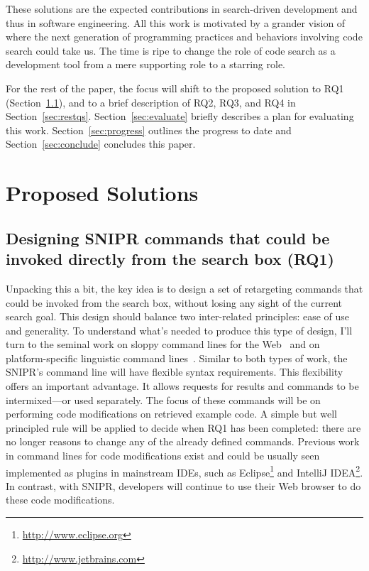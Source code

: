 \documentclass[conference]{IEEEtran}
\begin{document}
These solutions are the expected contributions in search-driven development and thus in software engineering. All this work is motivated by a grander vision of where the next generation of programming practices and behaviors involving code search could take us. The time is ripe to change the role of code search as a development tool from a mere supporting role to a starring role. 

For the rest of the paper, the focus will shift to the proposed solution to RQ1 (Section~\ref{sec:rq1}), and to a brief description of RQ2, RQ3, and RQ4 in Section~\ref{sec:restqs}. Section~\ref{sec:evaluate} briefly describes a plan for evaluating this work. Section~\ref{sec:progress} outlines the progress to date and Section~\ref{sec:conclude} concludes this paper. 

\section{Proposed Solutions}
\subsection{Designing \uppercase{SnipR} commands that could be invoked directly from the search box (RQ1)}
\label{sec:rq1}
Unpacking this a bit, the key idea is to design a set of retargeting commands that could be invoked from the search box, without losing any sight of the current search goal. This design should balance two inter-related principles: ease of use and generality. To understand what's needed to produce this type of design, I'll turn to the seminal work on sloppy command lines for the Web~\cite{Little:2007dh, Miller:2008ge} and on platform-specific linguistic command lines~\cite{Raskin:2008wb}. Similar to both types of work, the \uppercase{SnipR}'s command line will have flexible syntax requirements. This flexibility offers an important advantage. It allows requests for results and commands to be intermixed---or used separately. The focus of these commands will be on performing code modifications on retrieved example code. A simple but well principled rule will be applied to decide when RQ1 has been completed: there are no longer reasons to change any of the already defined commands. Previous work in command lines for code modifications exist and could be usually seen implemented as plugins in mainstream IDEs, such as Eclipse\footnote{\url{http://www.eclipse.org}} and IntelliJ IDEA\footnote{\url{http://www.jetbrains.com}}. In contrast, with \uppercase{SnipR}, developers will continue to use their Web browser to do these code modifications. 
\end{document}

